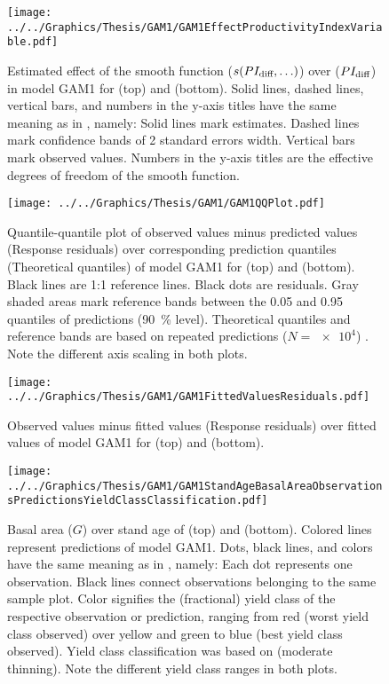 \begin{figure}[h]
  \centering
  \texttt{[image: ../../Graphics/Thesis/GAM1/GAM1EffectProductivityIndexVariable.pdf]}
  \caption{Estimated effect of the \ProductivityIndexVariableText{} smooth function (\(s(PI_{\text{diff}}{}, \ldots)\)) over \ProductivityIndexVariableText{} (\(PI_{\text{diff}}{}\)) in model GAM1 for \Beech{} (top) and \Spruce{} (bottom).  Solid lines, dashed lines, vertical bars, and numbers in the y-axis titles have the same meaning as in , namely:  Solid lines mark estimates.  Dashed lines mark confidence bands of 2 standard errors width.  Vertical bars mark observed values.  Numbers in the y-axis titles are the effective degrees of freedom of the smooth function.}
  \label{fig:GAM1EffectProductivityIndexVariable}
\end{figure}

\begin{figure}[h]
  \centering
  \texttt{[image: ../../Graphics/Thesis/GAM1/GAM1QQPlot.pdf]}
  \caption{Quantile-quantile plot of observed values minus predicted values (Response residuals) over corresponding prediction quantiles (Theoretical quantiles) of model GAM1 for \Beech{} (top) and \Spruce{} (bottom).  Black lines are 1:1 reference lines.  Black dots are residuals.  Gray shaded areas mark reference bands between the \num{0.05} and \num{0.95} quantiles of predictions (\SI{90}{\percent} level).  Theoretical quantiles and reference bands are based on repeated predictions (\(N = \num{e4}\)) \parencite{Augustin2012}.  Note the different axis scaling in both plots.}
  \label{fig:GAM1QQPlot}
\end{figure}

\begin{figure}[h]
  \centering
  \texttt{[image: ../../Graphics/Thesis/GAM1/GAM1FittedValuesResiduals.pdf]}
  \caption{Observed values minus fitted values (Response residuals) over fitted values of model GAM1 for \Beech{} (top) and \Spruce{} (bottom).}
  \label{fig:GAM1FittedValuesResiduals}
\end{figure}

\begin{figure}[h]
  \centering
  \texttt{[image: ../../Graphics/Thesis/GAM1/GAM1StandAgeBasalAreaObservationsPredictionsYieldClassClassification.pdf]}
  \caption{Basal area (\(G\)) over stand age of \Beech{} (top) and \Spruce{} (bottom).  Colored lines represent predictions of model GAM1.  Dots, black lines, and colors have the same meaning as in , namely:  Each dot represents one observation.  Black lines connect observations belonging to the same sample plot.  Color signifies the (fractional) yield class of the respective observation or prediction, ranging from red (worst yield class observed) over yellow and green to blue (best yield class observed). Yield class classification was based on \textcite{Schober1995} (moderate thinning).  Note the different yield class ranges in both plots.}
  \label{fig:GAM1StandAgeBasalAreaObservationsPredictionsYieldClassClassification}
\end{figure}

